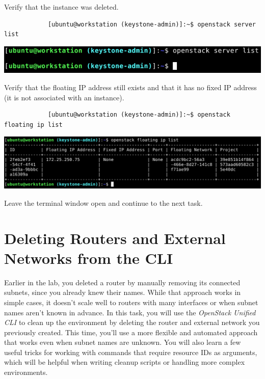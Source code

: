\documentclass[letterpaper, 12pt]{article}
\begin{document}
\begin{enumerate}
    \begin{labstep}
        Verify that the instance was deleted.
        \begin{lstlisting}
            [ubuntu@workstation (keystone-admin)]:~$ openstack server list
        \end{lstlisting}

        \begin{center}
            \includegraphics[width=\linewidth]{images/part3/step26.png}
        \end{center}
    \end{labstep}

    \begin{labstep}
        Verify that the floating IP address still exists and that it has no fixed IP address (it is not associated with an instance).
        \begin{lstlisting}
            [ubuntu@workstation (keystone-admin)]:~$ openstack floating ip list
        \end{lstlisting}

        \begin{center}
            \includegraphics[width=\linewidth]{images/part3/step27.png}
        \end{center}
    \end{labstep}

    \begin{labstep}
        Leave the terminal window open and continue to the next task.
    \end{labstep}

\end{enumerate}

\section{Deleting Routers and External Networks from the CLI}\label{sec:deleting_routers_and_external_networks_from_the_cli}
Earlier in the lab, you deleted a router by manually removing its connected subnets, since you already knew their names.
While that approach works in simple cases, it doesn't scale well to routers with many interfaces or when subnet names aren't known in advance.
In this task, you will use the \textit{OpenStack Unified CLI} to clean up the environment by deleting the router and external network you previously created.
This time, you'll use a more flexible and automated approach that works even when subnet names are unknown.
You will also learn a few useful tricks for working with commands that require resource IDs as arguments, which will be helpful when writing cleanup scripts or handling more complex environments.
\end{document}
